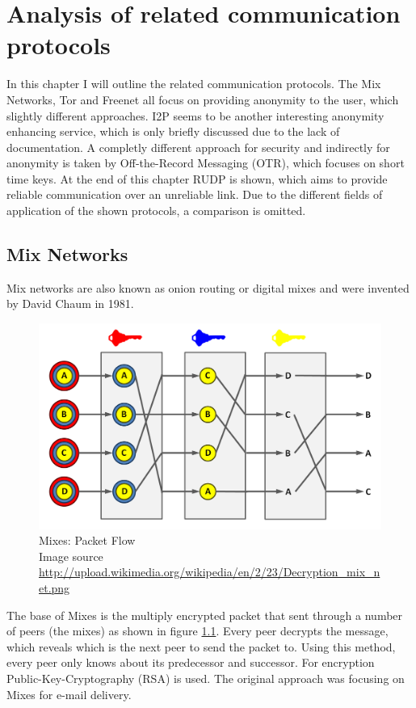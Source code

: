 \chapter{Analysis of related communication protocols}
\label{commprotocols}
In this chapter I will outline the related communication protocols.
The Mix Networks, Tor and Freenet all focus on providing anonymity to
the user, which slightly different approaches. I2P seems to be another
interesting anonymity enhancing service, which is only
briefly discussed due to the lack of documentation. A completly different
approach for security and indirectly for anonymity is taken by
Off-the-Record Messaging (OTR), which focuses on short time keys.
At the end of this chapter RUDP is shown, which aims to provide reliable
communication over an unreliable link.
Due to the different fields of application of the shown protocols, a
comparison is omitted.
\section{Mix Networks}
Mix networks are also known as onion routing or digital mixes and
were invented by David Chaum in 1981.\cite{Chaum:1981:UEM:358549.358563}
\begin{figure}
    \centering
    \caption[Mixes: Packet Flow]{Mixes: Packet Flow\\Image source \url{http://upload.wikimedia.org/wikipedia/en/2/23/Decryption_mix_net.png}}
    \label{mixesflow}
    \includegraphics[scale=0.3]{Decryption_mix_net.png}
\end{figure}
The base of Mixes is the multiply encrypted packet that sent through a
number of peers (the mixes) as shown in figure \ref{mixesflow}.
Every peer decrypts the message, which reveals which is the next peer
to send the packet to. Using this method, every peer only knows about
its predecessor and successor. For encryption Public-Key-Cryptography (RSA) is used.
The original approach was focusing on Mixes for e-mail delivery.

